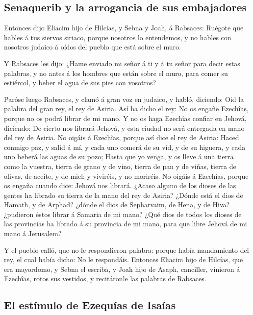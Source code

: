 \hypertarget{senaquerib-y-la-arrogancia-de-sus-embajadores}{%
\subsection{Senaquerib y la arrogancia de sus
embajadores}\label{senaquerib-y-la-arrogancia-de-sus-embajadores}}

 Entonces dijo Eliacim hijo de Hilcías, y Sebna y Joah, á
Rabsaces: Ruégote que hables á tus siervos siriaco, porque nosotros lo
entendemos, y no hables con nosotros judaico á oídos del pueblo que está
sobre el muro.

 Y Rabsaces les dijo: ¿Hame enviado mi señor á ti y á tu
señor para decir estas palabras, y no antes á los hombres que están
sobre el muro, para comer su estiércol, y beber el agua de sus pies con
vosotros?

 Paróse luego Rabsaces, y clamó á gran voz en judaico, y
habló, diciendo: Oid la palabra del gran rey, el rey de Asiria.
 Así ha dicho el rey: No os engañe Ezechîas, porque no os
podrá librar de mi mano.  Y no os haga Ezechîas confiar
en Jehová, diciendo: De cierto nos librará Jehová, y esta ciudad no será
entregada en mano del rey de Asiria.  No oigáis á
Ezechîas, porque así dice el rey de Asiria: Haced conmigo paz, y salid á
mí, y cada uno comerá de su vid, y de su higuera, y cada uno beberá las
aguas de su pozo;  Hasta que yo venga, y os lleve á una
tierra como la vuestra, tierra de grano y de vino, tierra de pan y de
viñas, tierra de olivas, de aceite, y de miel; y viviréis, y no
moriréis. No oigáis á Ezechîas, porque os engaña cuando dice: Jehová nos
librará.  ¿Acaso alguno de los dioses de las gentes ha
librado su tierra de la mano del rey de Asiria?  ¿Dónde
está el dios de Hamath, y de Arphad? ¿dónde el dios de Sepharvaim, de
Hena, y de Hiva? ¿pudieron éstos librar á Samaria de mi mano?
 ¿Qué dios de todos los dioses de las provincias ha
librado á su provincia de mi mano, para que libre Jehová de mi mano á
Jerusalem?

 Y el pueblo calló, que no le respondieron palabra:
porque había mandamiento del rey, el cual había dicho: No le respondáis.
 Entonces Eliacim hijo de Hilcías, que era mayordomo, y
Sebna el escriba, y Joah hijo de Asaph, canciller, vinieron á Ezechîas,
rotos sus vestidos, y recitáronle las palabras de Rabsaces.

\hypertarget{el-estuxedmulo-de-ezequuxedas-de-isauxedas}{%
\subsection{El estímulo de Ezequías de
Isaías}\label{el-estuxedmulo-de-ezequuxedas-de-isauxedas}}

